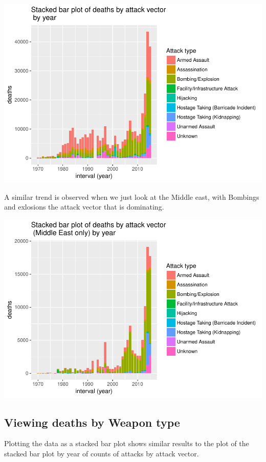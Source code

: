 \documentclass[]{article}
\begin{document}
\includegraphics{Peters_experiment_markdown_files/figure-latex/unnamed-chunk-7-1.pdf}

A similar trend is observed when we just look at the Middle east, with
Bombings and exlosions the attack vector that is dominating.

\includegraphics{Peters_experiment_markdown_files/figure-latex/unnamed-chunk-8-1.pdf}

\subsection{Viewing deaths by Weapon
type}\label{viewing-deaths-by-weapon-type}

Plotting the data as a stacked bar plot shows similar results to the
plot of the stacked bar plot by year of counts of attacks by attack
vector.
\end{document}
